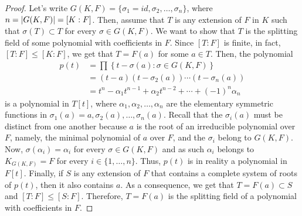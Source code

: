 \begin{proof}
  Let's write $G(K,F)=\{\sigma_{1}=id,\sigma_{2},\ldots,\sigma_{n}\}$, where $n=\lvert G(K,F)\rvert=[K:F]$. Then, assume that $T$ is any extension of $F$ in $K$ such that $\sigma(T)\subset{T}$ for every ${\sigma}\in{G(K,F)}$. We want to show that $T$ is the splitting field of some polynomial with coefficients in $F$. Since $[T:F]$ is finite, in fact, $[T:F]\leqslant{[K:F]}$, we get that $T=F(a)$ for some ${a}\in{T}$. Then, the polynomial
  \begin{align*}
    p(t)
    &=
    \prod\left\{t-\sigma(a):{\sigma}\in{G(K,F)}\right\}
    \\
    &=
    (t-a)(t-\sigma_{2}(a))\cdots(t-\sigma_{n}(a))
    \\
    &=
    t^{n}-\alpha_{1}t^{n-1}+\alpha_{2}t^{n-2}+\cdots+(-1)^{n}\alpha_{n}
  \end{align*}
  is a polynomial in $T[t]$, where $\alpha_{1},\alpha_{2},\ldots,\alpha_{n}$ are the elementary symmetric functions in $\sigma_{1}(a)=a,\sigma_{2}(a),\ldots,\sigma_{n}(a)$. Recall that the $\sigma_{i}(a)$ must be distinct from one another because $a$ is the root of an irreducible polynomial over $F$, namely, the minimal polynomial of $a$ over $F$, and the $\sigma_{i}$ belong to $G(K,F)$. Now, $\sigma(\alpha_{i})=\alpha_{i}$ for every ${\sigma}\in{G(K,F)}$ and as such $\alpha_{i}$ belongs to $K_{G(K,F)}=F$ for every ${i}\in{\{1,\ldots,n\}}$. Thus, $p(t)$ is in reality a polynomial in $F[t]$. Finally, if $S$ is any extension of $F$ that contains a complete system of roots of $p(t)$, then it also contains $a$. As a consequence, we get that $T=F(a)\subset{S}$ and $[T:F]\leqslant{[S:F]}$. Therefore, $T=F(a)$ is the splitting field of a polynomial with coefficients in $F$.


\end{proof}
